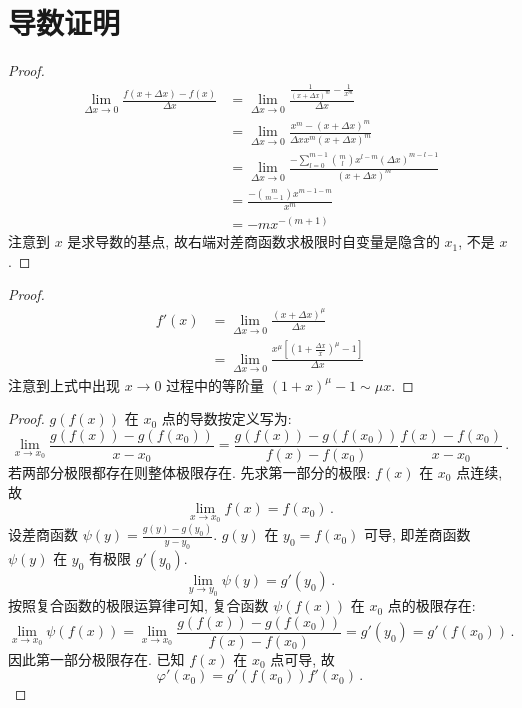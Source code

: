\documentclass{book}
\numberwithin{equation}{section}
\numberwithin{figure}{section}
\theoremstyle{definition}
\begin{document}
\section{导数证明}
\hypertarget{proof:PowerFunctionDerivatives}{}
\begin{proof}
  \begin{align*}
    \lim_{\Delta x\to 0}\frac{f(x+\Delta x)-f(x)}{\Delta x}&=\lim_{\Delta x\to 0}\frac{\frac{1}{(x+\Delta x)^m}-\frac{1}{x^m}}{\Delta x}\\
    &=\lim_{\Delta x\to 0}\frac{x^m-(x+\Delta x)^m}{\Delta x x^m (x+\Delta x)^m}\\
    &=\lim_{\Delta x\to 0}\frac{-\sum_{l=0}^{m-1}\binom{m}{l}x^{l-m}(\Delta x)^{m-l-1}}{(x+\Delta x)^m}\\
    &=\frac{-\binom{m}{m-1}x^{m-1-m}}{x^m}\\
    &=-m x^{-(m+1)}
  \end{align*}
  注意到 $x$ 是求导数的基点, 故右端对差商函数求极限时自变量是隐含的 $x_1$, 不是 $x$.
\end{proof}

\hypertarget{proof:PowerFunctionGeneralDerivatives}{}
\begin{proof}
  \begin{align*}
    f'(x)&=\lim_{\Delta x\to 0}\frac{(x+\Delta x)^\mu}{\Delta x}\\
    &=\lim_{\Delta x\to0}\frac{x^\mu\left[ \left( 1+\frac{\Delta x}{x} \right)^\mu-1 \right]}{\Delta x}
  \end{align*}
  注意到上式中出现 $x\to0$ 过程中的等阶量 $(1+x)^\mu-1\sim \mu x$.
\end{proof}

\hypertarget{proof:Derivative_of_Composite_Functions}{}
\begin{proof}
  $g(f(x))$ 在 $x_0$ 点的导数按定义写为:
  \begin{equation*}
    \lim_{x\to x_0}\frac{g(f(x))-g(f(x_0))}{x-x_0}=\frac{g(f(x))-g(f(x_0))}{f(x)-f(x_0)}\frac{f(x)-f(x_0)}{x-x_0}\,.
  \end{equation*}
  若两部分极限都存在则整体极限存在.
  先求第一部分的极限:
  $f(x)$ 在 $x_0$ 点连续, 故
  \begin{equation*}
    \lim_{x\to x_0} f(x)=f(x_0)\,.
  \end{equation*}
  设差商函数 $\psi(y)=\frac{g(y)-g(y_0)}{y-y_0}$.
  $g(y)$ 在 $y_0=f(x_0)$ 可导, 即差商函数 $\psi(y)$ 在 $y_0$ 有极限 $g'(y_0)$.
  \begin{equation*}
    \lim_{y\to y_0} \psi(y)=g'(y_0)\,.
  \end{equation*}
  按照复合函数的极限运算律可知, 复合函数 $\psi(f(x))$ 在 $x_0$ 点的极限存在:
  \begin{equation*}
    \lim_{x\to x_0}\psi(f(x))=\lim_{x\to x_0}\frac{g(f(x))-g(f(x_0))}{f(x)-f(x_0)}=g'(y_0)=g'(f(x_0))\,.
  \end{equation*}
  因此第一部分极限存在. 已知 $f(x)$ 在 $x_0$ 点可导, 故
  \begin{equation*}
    \varphi'(x_0)=g'(f(x_0))f'(x_0)\,.
  \end{equation*}
\end{proof}
\end{document}
